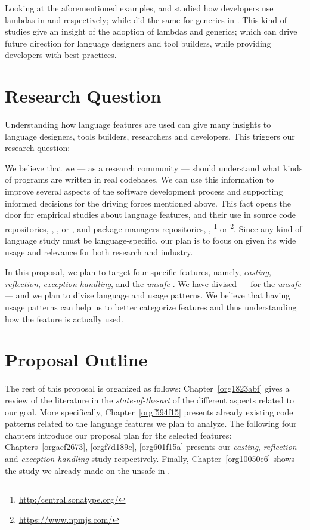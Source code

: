 \documentclass{usiinfdocprop}
\begin{document}
Looking at the aforementioned examples, \cite{mazinanian_understanding_2017} and \cite{uesbeck_empirical_2016} studied how developers use lambdas in \java{} and \cpp{} respectively; while \cite{parnin_java_2011,parnin_adoption_2013} did the same for generics in \java{}.
This kind of studies give an insight of the adoption of lambdas and generics; which can drive future direction for language designers and tool builders, while providing developers with best practices.

\section{Research Question}
\label{sec:org2a96af8}
Understanding how language features are used can give many insights to language designers, tools builders, researchers and developers.
This triggers our research question:


We believe that we --- as a research community --- should understand what kinds of programs are written in real codebases.
We can use this information to improve several aspects of the software development process and supporting informed decisions for the driving forces mentioned above.
This fact opens the door for empirical studies about language features, and their use in source code repositories, \eg{}, \github{}, \gitlab{} or \bitbucket{}, and package managers repositories, \eg{}, \mavencentral \footnote{\url{http:/central.sonatype.org/}} or \npm \footnote{\url{https://www.npmjs.com/}}. 
Since any kind of language study must be language-specific, our plan is to focus on \java{} given its wide usage and relevance for both research and industry.

In this proposal, we plan to target four specific \java{} features, namely, \emph{casting}, \emph{reflection}, \emph{exception handling}, and the \emph{unsafe \api{}}.
We have divised --- for the \emph{unsafe \api{}} --- and we plan to divise language and \api{} usage patterns.
We believe that having usage patterns can help us to better categorize features and thus understanding how the feature is actually used.

\section{Proposal Outline}
\label{sec:org3dfa4a5}
The rest of this proposal is organized as follows:
Chapter~\ref{org1823abf} gives a review of the literature in the \emph{state-of-the-art} of the different aspects related to our goal.
More specifically, Chapter~\ref{orgf594f15} presents already existing code patterns related to the language features we plan to analyze.
The following four chapters introduce our proposal plan for the selected features:
Chapters~\ref{orgaef2673}, \ref{orgf7d189c}, \ref{org601f15a} presents our \emph{casting}, \emph{reflection} and \emph{exception handling} study respectively.
Finally, Chapter~\ref{org10050e6} shows the study we already made on the unsafe \api{} in \java{}.
\end{document}
